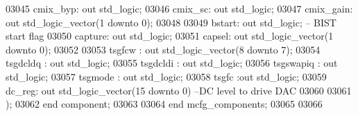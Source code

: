 \begin{DoxyCode}
03045         cmix\_byp: \textcolor{keywordflow}{out} \textcolor{comment}{std\_logic};
03046         cmix\_sc: \textcolor{keywordflow}{out} \textcolor{comment}{std\_logic};
03047         cmix\_gain: \textcolor{keywordflow}{out} \textcolor{comment}{std\_logic\_vector}(\textcolor{vhdllogic}{}\textcolor{vhdllogic}{1} \textcolor{keywordflow}{downto} \textcolor{vhdllogic}{}\textcolor{vhdllogic}{0});
03048 
03049         bstart: \textcolor{keywordflow}{out} \textcolor{comment}{std\_logic};          \textcolor{keyword}{-- BIST start flag}
03050         capture: \textcolor{keywordflow}{out} \textcolor{comment}{std\_logic};
03051         capsel: \textcolor{keywordflow}{out} \textcolor{comment}{std\_logic\_vector}(\textcolor{vhdllogic}{}\textcolor{vhdllogic}{1} \textcolor{keywordflow}{downto} \textcolor{vhdllogic}{}\textcolor{vhdllogic}{0});
03052         
03053         tsgfcw      : \textcolor{keywordflow}{out} \textcolor{comment}{std\_logic\_vector}(\textcolor{vhdllogic}{}\textcolor{vhdllogic}{8} \textcolor{keywordflow}{downto} \textcolor{vhdllogic}{}\textcolor{vhdllogic}{7});
03054         tsgdcldq    : \textcolor{keywordflow}{out} \textcolor{comment}{std\_logic};
03055         tsgdcldi    : \textcolor{keywordflow}{out} \textcolor{comment}{std\_logic};
03056         tsgswapiq   : \textcolor{keywordflow}{out} \textcolor{comment}{std\_logic};
03057         tsgmode     : \textcolor{keywordflow}{out} \textcolor{comment}{std\_logic};
03058         tsgfc           :\textcolor{keywordflow}{out} \textcolor{comment}{std\_logic};
03059         dc\_reg: \textcolor{keywordflow}{out} \textcolor{comment}{std\_logic\_vector}(\textcolor{vhdllogic}{}\textcolor{vhdllogic}{15} \textcolor{keywordflow}{downto} \textcolor{vhdllogic}{}\textcolor{vhdllogic}{0})\textcolor{keyword}{   --DC level to drive DAC}
03060 
03061     );
03062 \textcolor{keywordflow}{end} \textcolor{keywordflow}{component};
03063     
03064 \textcolor{keywordflow}{end} \textcolor{vhdlchar}{mcfg\_components};
03065 
03066 
\end{DoxyCode}
